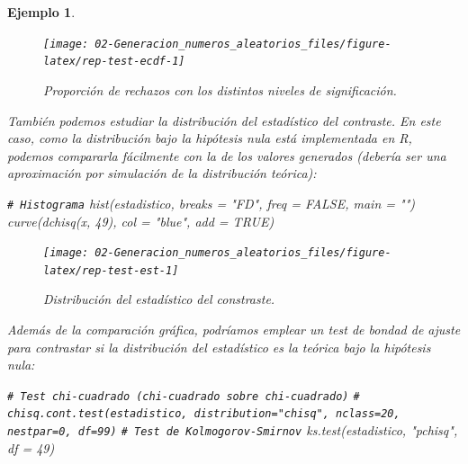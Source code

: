 \documentclass[
  10pt,
]{book}
\newenvironment{Shaded}{\begin{snugshade}}{\end{snugshade}}
\newcommand{\AttributeTok}[1]{\textcolor[rgb]{0.77,0.63,0.00}{#1}}
\newcommand{\CommentTok}[1]{\textcolor[rgb]{0.56,0.35,0.01}{\textit{#1}}}
\newcommand{\ConstantTok}[1]{\textcolor[rgb]{0.00,0.00,0.00}{#1}}
\newcommand{\DecValTok}[1]{\textcolor[rgb]{0.00,0.00,0.81}{#1}}
\newcommand{\FunctionTok}[1]{\textcolor[rgb]{0.00,0.00,0.00}{#1}}
\newcommand{\NormalTok}[1]{#1}
\newcommand{\StringTok}[1]{\textcolor[rgb]{0.31,0.60,0.02}{#1}}
\theoremstyle{break}
\newtheorem{example}{Ejemplo}[chapter]
\theoremstyle{nonumberplain}
\renewcommand{\CommentTok}[1]{\textcolor[rgb]{0.41,0.41,0.41}{\texttt{#1}}}
\begin{document}
\begin{example}
\begin{figure}[!htbp]

{\centering \texttt{[image: 02-Generacion\_numeros\_aleatorios\_files/figure-latex/rep-test-ecdf-1]} 

}

\caption{Proporción de rechazos con los distintos niveles de significación.}\label{fig:rep-test-ecdf}
\end{figure}

También podemos estudiar la distribución del estadístico del contraste.
En este caso, como la distribución bajo la hipótesis nula está implementada en R, podemos compararla fácilmente con la de los valores generados (debería ser una aproximación por simulación de la distribución teórica):

\begin{Shaded}
\begin{Highlighting}[]
\CommentTok{\# Histograma}
\FunctionTok{hist}\NormalTok{(estadistico, }\AttributeTok{breaks =} \StringTok{"FD"}\NormalTok{, }\AttributeTok{freq =} \ConstantTok{FALSE}\NormalTok{, }\AttributeTok{main =} \StringTok{""}\NormalTok{)}
\FunctionTok{curve}\NormalTok{(}\FunctionTok{dchisq}\NormalTok{(x, }\DecValTok{49}\NormalTok{), }\AttributeTok{col =} \StringTok{"blue"}\NormalTok{, }\AttributeTok{add =} \ConstantTok{TRUE}\NormalTok{)}
\end{Highlighting}
\end{Shaded}

\begin{figure}[!htbp]

{\centering \texttt{[image: 02-Generacion\_numeros\_aleatorios\_files/figure-latex/rep-test-est-1]} 

}

\caption{Distribución del estadístico del constraste.}\label{fig:rep-test-est}
\end{figure}

Además de la comparación gráfica, podríamos emplear un test de bondad de ajuste para contrastar si la distribución del estadístico es la teórica bajo la hipótesis nula:

\begin{Shaded}
\begin{Highlighting}[]
\CommentTok{\# Test chi{-}cuadrado (chi{-}cuadrado sobre chi{-}cuadrado)}
\CommentTok{\# chisq.cont.test(estadistico, distribution="chisq", nclass=20, nestpar=0, df=99)}
\CommentTok{\# Test de Kolmogorov{-}Smirnov}
\FunctionTok{ks.test}\NormalTok{(estadistico, }\StringTok{"pchisq"}\NormalTok{, }\AttributeTok{df =} \DecValTok{49}\NormalTok{)}
\end{Highlighting}
\end{Shaded}


\end{example}
\end{document}
